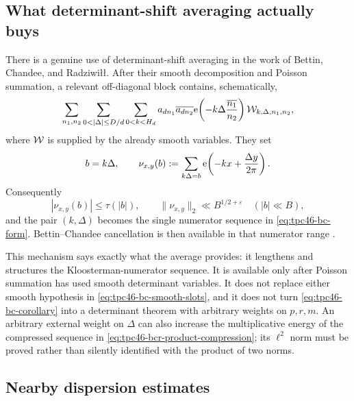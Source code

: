 \subsection{What determinant-shift averaging actually buys}
\label{subsec:tpc46-bcr-averaging}

There is a genuine use of determinant-shift averaging in the work of
Bettin, Chandee, and Radziwi\l\l.  After their smooth decomposition and
Poisson summation, a relevant off-diagonal block contains, schematically,
\begin{equation}
 \sum_{n_1,n_2}
 \sum_{0<|\Delta|\le D/d}
 \sum_{0<k<H_d}
 a_{dn_1}\overline{a_{dn_2}}
 \e\!\left(-k\Delta\frac{\overline{n_1}}{n_2}\right)
 \cW_{k,\Delta,n_1,n_2},
 \label{eq:tpc46-bcr-offdiagonal}
\end{equation}
where \(\mathcal W\) is supplied by the already smooth variables.  They set
\begin{equation}
 b=k\Delta,
 \qquad
 \nu_{x,y}(b)
 :=\sum_{k\Delta=b}
 \mathrm e\!\left(-kx+\frac{\Delta y}{2\pi}\right).
 \label{eq:tpc46-bcr-product-compression}
\end{equation}
Consequently
\begin{equation}
 |\nu_{x,y}(b)|\le \tau(|b|),
 \qquad
 \|\nu_{x,y}\|_2\ll B^{1/2+\varepsilon}
 \quad (|b|\ll B),
 \label{eq:tpc46-bcr-nu-norm}
\end{equation}
and the pair \((k,\Delta)\) becomes the single numerator sequence in
\eqref{eq:tpc46-bc-form}.  Bettin--Chandee cancellation is then
available in that numerator range \citep[Section~5, especially the
reduction preceding their small-frequency estimate]{BCR2017}.

This mechanism says exactly what the average provides: it lengthens and
structures the Kloosterman-numerator sequence.  It is available only
after Poisson summation has used smooth determinant variables.  It does
not replace either smooth hypothesis in
\eqref{eq:tpc46-bc-smooth-slots}, and it does not turn
\eqref{eq:tpc46-bc-corollary} into a determinant theorem with arbitrary
weights on \(p,r,m\).  An arbitrary external weight on \(\Delta\) can
also increase the multiplicative energy of the compressed sequence in
\eqref{eq:tpc46-bcr-product-compression}; its \(\ell^2\) norm must be
proved rather than silently identified with the product of two norms.

\subsection{Nearby dispersion estimates}
\label{subsec:tpc46-nearby-dispersion}

